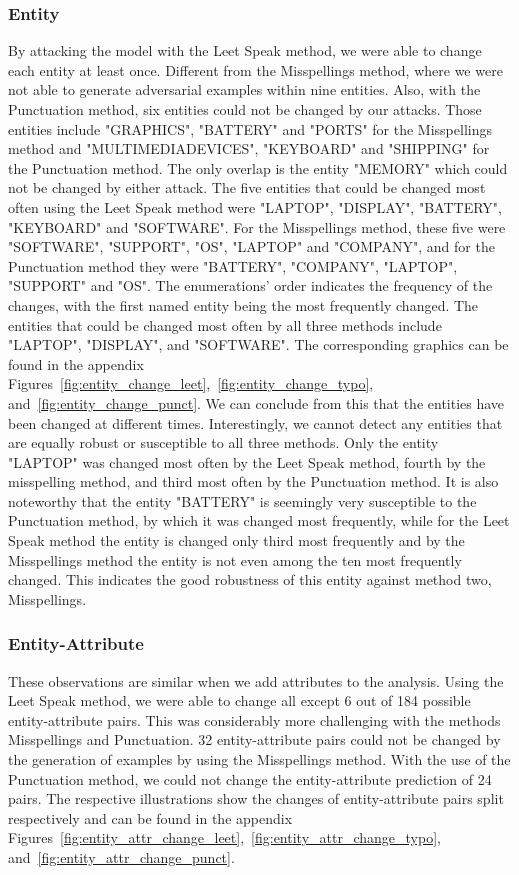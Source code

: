\subsubsection{Entity}
By attacking the model with the Leet Speak method, we were able to change each entity at least once. Different from the Misspellings method, where we were not able to generate adversarial examples within nine entities. Also, with the Punctuation method, six entities could not be changed by our attacks. Those entities include "GRAPHICS", "BATTERY" and "PORTS" for the Misspellings method and "MULTIMEDIA\textunderscore DEVICES", "KEYBOARD" and "SHIPPING" for the Punctuation method. The only overlap is the entity "MEMORY" which could not be changed by either attack. 
The five entities that could be changed most often using the Leet Speak method were "LAPTOP", "DISPLAY", "BATTERY", "KEYBOARD" and "SOFTWARE". For the Misspellings method, these five were "SOFTWARE", "SUPPORT", "OS", "LAPTOP" and "COMPANY", and for the Punctuation method they were "BATTERY", "COMPANY", "LAPTOP", "SUPPORT" and "OS". The enumerations' order indicates the frequency of the changes, with the first named entity being the most frequently changed. 
The entities that could be changed most often by all three methods include "LAPTOP", "DISPLAY", and "SOFTWARE". 
The corresponding graphics can be found in the appendix Figures~\ref{fig:entity_change_leet},~\ref{fig:entity_change_typo}, and~\ref{fig:entity_change_punct}. 
We can conclude from this that the entities have been changed at different times.  Interestingly, we cannot detect any entities that are equally robust or susceptible to all three methods. Only the entity "LAPTOP" was changed most often by the Leet Speak method, fourth by the misspelling method, and third most often by the Punctuation method. It is also noteworthy that the entity "BATTERY" is seemingly very susceptible to the Punctuation method, by which it was changed most frequently, while for the Leet Speak method the entity is changed only third most frequently and by the Misspellings method the entity is not even among the ten most frequently changed. This indicates the good robustness of this entity against method two, Misspellings. 

\subsubsection{Entity-Attribute}
These observations are similar when we add attributes to the analysis. Using the Leet Speak method, we were able to change all except 6 out of 184 possible entity-attribute pairs. This was considerably more challenging with the methods Misspellings and Punctuation. 32 entity-attribute pairs could not be changed by the generation of examples by using the Misspellings method. With the use of the Punctuation method, we could not change the entity-attribute prediction of 24 pairs. The respective illustrations show the changes of entity-attribute pairs split respectively and can be found in the appendix Figures~\ref{fig:entity_attr_change_leet},~\ref{fig:entity_attr_change_typo}, and~\ref{fig:entity_attr_change_punct}.

